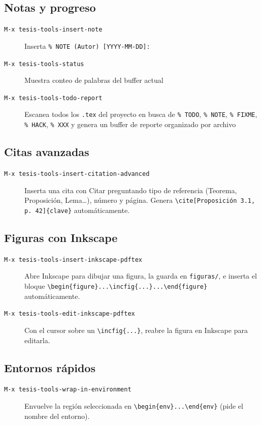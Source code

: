 \documentclass[11pt]{article}
\begin{document}
\subsection{Notas y progreso}
\label{sec:org27d65d1}
\begin{description}
\item[{\texttt{M-x tesis-tools-insert-note}}] Inserta \texttt{\% NOTE (Autor) [YYYY-MM-DD]:}
\item[{\texttt{M-x tesis-tools-status}}] Muestra conteo de palabras del buffer actual
\item[{\texttt{M-x tesis-tools-todo-report}}] Escanea todos los \texttt{.tex} del proyecto en busca de \texttt{\% TODO}, \texttt{\% NOTE}, \texttt{\% FIXME}, \texttt{\% HACK}, \texttt{\% XXX} y genera un buffer de reporte organizado por archivo
\end{description}
\subsection{Citas avanzadas}
\label{sec:orgbd17de1}
\begin{description}
\item[{\texttt{M-x tesis-tools-insert-citation-advanced}}] Inserta una cita con Citar preguntando tipo de referencia (Teorema, Proposición, Lema\ldots{}), número y página. Genera \texttt{\textbackslash{}cite[Proposición 3.1, p. 42]\{clave\}} automáticamente.
\end{description}
\subsection{Figuras con Inkscape}
\label{sec:orgd6edc9a}
\begin{description}
\item[{\texttt{M-x tesis-tools-insert-inkscape-pdftex}}] Abre Inkscape para dibujar una figura, la guarda en \texttt{figuras/}, e inserta el bloque \texttt{\textbackslash{}begin\{figure\}...\textbackslash{}incfig\{...\}...\textbackslash{}end\{figure\}} automáticamente.
\item[{\texttt{M-x tesis-tools-edit-inkscape-pdftex}}] Con el cursor sobre un \texttt{\textbackslash{}incfig\{...\}}, reabre la figura en Inkscape para editarla.
\end{description}
\subsection{Entornos rápidos}
\label{sec:orgccbb0a8}
\begin{description}
\item[{\texttt{M-x tesis-tools-wrap-in-environment}}] Envuelve la región seleccionada en \texttt{\textbackslash{}begin\{env\}...\textbackslash{}end\{env\}} (pide el nombre del entorno).
\end{description}
\end{document}
